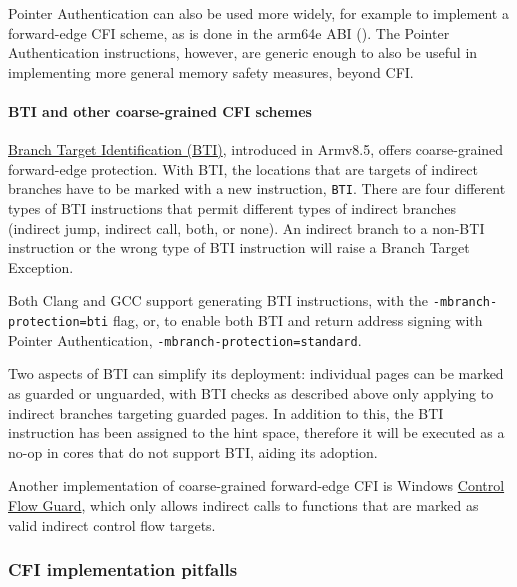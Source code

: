 \documentclass[
  a4paper,
]{report}
\begin{document}
Pointer Authentication can also be used more widely, for example to
implement a forward-edge CFI scheme, as is done in the arm64e ABI
(). The Pointer
Authentication instructions, however, are generic enough to also be
useful in implementing more general memory safety measures, beyond CFI.

\paragraph{BTI and other coarse-grained CFI schemes}\label{sec:bti}

\href{https://developer.arm.com/documentation/102433/0100/Jump-oriented-programming?lang=en}{\label{__index_entry_56}{Branch
Target Identification (BTI)}},
introduced in Armv8.5, offers coarse-grained forward-edge protection.
With BTI, the locations that are targets of indirect branches have to be
marked with a new instruction, \texttt{BTI}. There are four different
types of BTI instructions that permit different types of indirect
branches (indirect jump, indirect call, both, or none). An indirect
branch to a non-BTI instruction or the wrong type of BTI instruction
will raise a Branch Target Exception.

Both Clang and GCC support generating BTI instructions, with the
\texttt{-mbranch-protection=bti} flag, or, to enable both BTI and return
address signing with Pointer Authentication,
\texttt{-mbranch-protection=standard}.

Two aspects of BTI can simplify its deployment: individual pages can be
marked as guarded or unguarded, with BTI checks as described above only
applying to indirect branches targeting guarded pages. In addition to
this, the BTI instruction has been assigned to the hint space, therefore
it will be executed as a no-op in cores that do not support BTI, aiding
its adoption.

Another implementation of coarse-grained forward-edge CFI is Windows
\href{https://docs.microsoft.com/en-us/windows/win32/secbp/control-flow-guard}{Control
Flow Guard}, which only allows indirect calls to functions that are
marked as valid indirect control flow targets.

\subsubsection{CFI implementation
pitfalls}\label{cfi-implementation-pitfalls}
\end{document}
